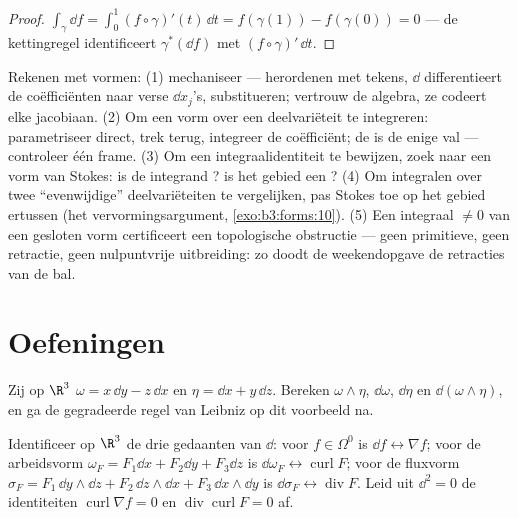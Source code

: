 \begin{proof}
$\int_\gamma\dd f = \int_0^1(f\circ\gamma)'(t)\,\dd t =
f(\gamma(1)) - f(\gamma(0)) = 0$ --- de kettingregel
identificeert $\gamma^*(\dd f)$ met $(f\circ\gamma)'\,\dd t$.
\end{proof}

\begin{method}\label{met:b3:forms:method}
Rekenen met vormen: (1) mechaniseer --- 
herordenen met tekens, $\dd$ differentieert de coëfficiënten naar
verse $\dd x_j$'s,  substitueren; vertrouw de
algebra, ze codeert elke jacobiaan. (2) Om een vorm over een
deelvariëteit te integreren: parametriseer direct, trek terug,
integreer de coëfficiënt; de  is de enige val ---
controleer één frame. (3) Om een integraalidentiteit te bewijzen,
zoek naar een vorm van Stokes: is de integrand ? is het
gebied een ? (4) Om integralen over twee ``evenwijdige''
deelvariëteiten te vergelijken, pas Stokes toe op het gebied
ertussen (het vervormingsargument, \cref{exo:b3:forms:10}). (5)
Een integraal $\neq 0$ van een gesloten vorm certificeert een
topologische obstructie --- geen primitieve, geen retractie, geen
nulpuntvrije uitbreiding: zo doodt de weekendopgave de retracties
van de bal.
\end{method}

\section{Oefeningen}

\begin{exercise}[$\star$]\label{exo:b3:forms:1}
Zij op $\R^3$ $\omega = x\,\dd y - z\,\dd x$ en $\eta = \dd x +
y\,\dd z$. Bereken $\omega\wedge\eta$, $\dd\omega$, $\dd\eta$ en
$\dd(\omega\wedge\eta)$, en ga de gegradeerde regel van Leibniz
op dit voorbeeld na.
\end{exercise}

\begin{exercise}[$\star$]\label{exo:b3:forms:2}
Identificeer op $\R^3$ de drie gedaanten van $\dd$: voor $f \in
\Omega^0$ is $\dd f \leftrightarrow \nabla f$; voor de arbeidsvorm
$\omega_F = F_1\dd x + F_2\dd y + F_3\dd z$ is $\dd\omega_F
\leftrightarrow \operatorname{curl}F$; voor de fluxvorm $\sigma_F
= F_1\,\dd y\wedge\dd z + F_2\,\dd z\wedge\dd x + F_3\,\dd
x\wedge\dd y$ is $\dd\sigma_F \leftrightarrow
\operatorname{div}F$. Leid uit $\dd^2 = 0$ de identiteiten
$\operatorname{curl}\nabla f = 0$ en
$\operatorname{div}\operatorname{curl}F = 0$ af.
\end{exercise}

